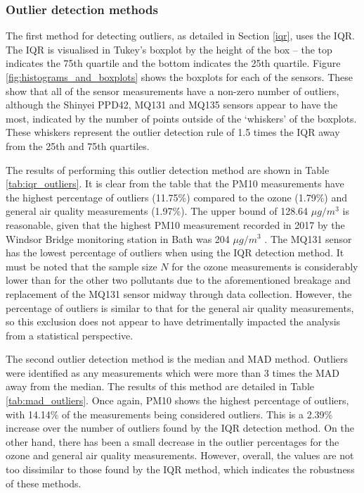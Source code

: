 \documentclass[11pt]{report}
\begin{document}
\subsubsection{Outlier detection methods}

The first method for detecting outliers, as detailed in Section \ref{iqr}, uses the IQR. The IQR is visualised in Tukey's boxplot by the height of the box -- the top indicates the 75th quartile and the bottom indicates the 25th quartile. Figure \ref{fig:histograms_and_boxplots} shows the boxplots for each of the sensors. These show that all of the sensor measurements have a non-zero number of outliers, although the Shinyei PPD42, MQ131 and MQ135 sensors appear to have the most, indicated by the number of points outside of the `whiskers' of the boxplots. These whiskers represent the outlier detection rule of 1.5 times the IQR away from the 25th and 75th quartiles.

The results of performing this outlier detection method are shown in Table \ref{tab:iqr_outliers}. It is clear from the table that the PM10 measurements have the highest percentage of outliers (11.75\%) compared to the ozone (1.79\%) and general air quality measurements (1.97\%). The upper bound of 128.64 $\mu g/m^3$ is reasonable, given that the highest PM10 measurement recorded in 2017 by the Windsor Bridge monitoring station in Bath was 204 $\mu g/m^3$ \citep{courthold2018max}. The MQ131 sensor has the lowest percentage of outliers when using the IQR detection method. It must be noted that the sample size $N$ for the ozone measurements is considerably lower than for the other two pollutants due to the aforementioned breakage and replacement of the MQ131 sensor midway through data collection. However, the percentage of outliers is similar to that for the general air quality measurements, so this exclusion does not appear to have detrimentally impacted the analysis from a statistical perspective.

The second outlier detection method is the median and MAD method. Outliers were identified as any measurements which were more than 3 times the MAD away from the median. The results of this method are detailed in Table \ref{tab:mad_outliers}. Once again, PM10 shows the highest percentage of outliers, with 14.14\% of the measurements being considered outliers. This is a 2.39\% increase over the number of outliers found by the IQR detection method. On the other hand, there has been a small decrease in the outlier percentages for the ozone and general air quality measurements. However, overall, the values are not too dissimilar to those found by the IQR method, which indicates the robustness of these methods.
\end{document}
